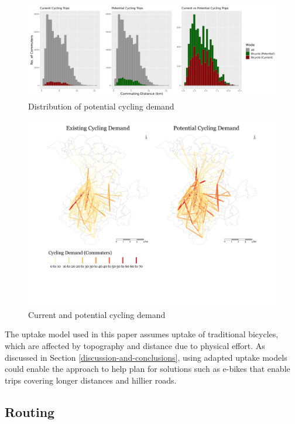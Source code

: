 \documentclass[
]{article}
\begin{document}
\begin{figure}

{\centering \includegraphics[width=0.9\linewidth]{data/Manchester/Plots/histogram_distance_cycling_potential_current_all} 

}

\caption{Distribution of potential cycling demand}\label{fig:potdemhistograms}
\end{figure}

\begin{figure}[H]

{\centering \includegraphics[width=0.65\linewidth]{data/Manchester/Plots/desire_facet_cycling} 

}

\caption{Current and potential cycling demand}\label{fig:desirefacetcycling}
\end{figure}

The uptake model used in this paper assumes uptake of traditional bicycles, which are affected by topography and distance due to physical effort.
As discussed in Section \ref{discussion-and-conclusions}, using adapted uptake models could enable the approach to help plan for solutions such as e-bikes that enable trips covering longer distances and hillier roads.

\hypertarget{routing}{%
\subsection{Routing}\label{routing}}
\end{document}
